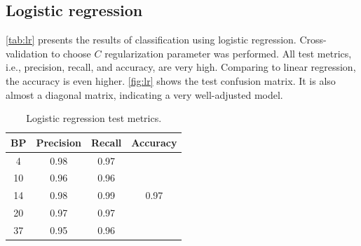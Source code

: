 \documentclass[twocolumn]{article}
\begin{document}
            \subsection{Logistic regression}

                  \autoref{tab:lr} presents the results of classification using logistic regression. Cross-validation to choose $C$ regularization parameter was performed. All test metrics, i.e., precision, recall, and accuracy, are very high. Comparing to linear regression, the accuracy is even higher. \autoref{fig:lr} shows the test confusion matrix. It is also almost a diagonal matrix, indicating a very well-adjusted model.

                  \begin{table}[H]
                        \centering
                        \caption{Logistic regression test metrics.}
                        \label{tab:lr}
                        \begin{tabular}{c|cc|c}
                        BP & Precision & Recall & Accuracy              \\ \hline
                        4  & 0.98      & 0.97   & \multirow{5}{*}{0.97} \\
                        10 & 0.96      & 0.96   &                       \\
                        14 & 0.98      & 0.99   &                       \\
                        20 & 0.97      & 0.97   &                       \\
                        37 & 0.95      & 0.96   &                      
                        \end{tabular}
                  \end{table}
\end{document}
